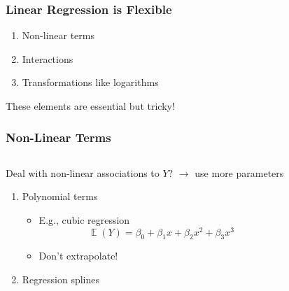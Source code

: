 \documentclass[
    utf8,
    aspectratio=169
]{beamer}  %
\DeclareMathOperator{\E}{\mathbb{E}}  %
\begin{document}
\begin{frame}
	\frametitle{Linear Regression is Flexible}
	\begin{enumerate}
		\item Non-linear terms
		\item Interactions
		\item Transformations like logarithms
	\end{enumerate}
	
	\vfill
	
	\begin{alertblock}{These elements are essential but tricky!}
	\end{alertblock}
\end{frame}

\begin{frame}
	\frametitle{Non-Linear Terms}
	\begin{columns}
		\begin{block}{Deal with non-linear associations to $Y$?} $\rightarrow$ use more parameters
		\begin{enumerate}
			\item Polynomial terms
			\begin{itemize}
				\item E.g., cubic regression
				$$
					\E(Y) = \beta_0 + \beta_1 x + \beta_2 x^2 + \beta_3 x^3
				$$
				\item Don't extrapolate!
			\end{itemize}
			\item Regression splines
		\end{enumerate}
		\end{block}
		

\end{columns}
\end{frame}
\end{document}
